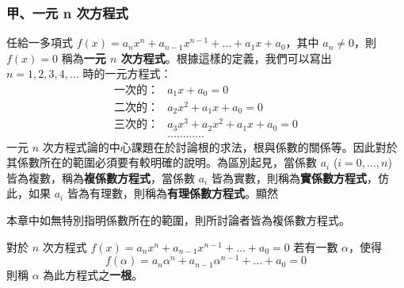 \subsubsection*{甲、一元 n 次方程式}\label{subsec:b6s-2-1-a}

任給一多項式 $f(x) = a_n x^n + a_{n-1} x^{n-1} + \dots + a_1 x + a_0$，其中 $a_n \ne 0$，則 $f(x)=0$ 稱為\textbf{一元 $n$ 次方程式}。根據這樣的定義，我們可以寫出 $n=1, 2, 3, 4, \dots$ 時的一元方程式：
\begin{align*}
\text{一次的：}& a_1 x + a_0 = 0 \\
\text{二次的：}& a_2 x^2 + a_1 x + a_0 = 0 \\
\text{三次的：}& a_3 x^3 + a_2 x^2 + a_1 x + a_0 = 0 \\
&\dots\dots\dots\dots
\end{align*}
一元 $n$ 次方程式論的中心課題在於討論根的求法，根與係數的關係等。因此對於其係數所在的範圍必須要有較明確的說明。為區別起見，當係數 $a_i$ ($i=0, \dots, n$) 皆為複數，稱為\textbf{複係數方程式}，當係數 $a_i$ 皆為實數，則稱為\textbf{實係數方程式}，仿此，如果 $a_i$ 皆為有理數，則稱為\textbf{有理係數方程式}。顯然

\begin{center}
\end{center}

本章中如無特別指明係數所在的範圍，則所討論者皆為複係數方程式。

\begin{definition}\label{def:b6s-2-1}
對於 $n$ 次方程式 $f(x) = a_n x^n + a_{n-1} x^{n-1} + \dots + a_0 = 0$ 若有一數 $\alpha$，使得
\[ f(\alpha) = a_n \alpha^n + a_{n-1} \alpha^{n-1} + \dots + a_0 = 0 \]
則稱 $\alpha$ 為此方程式之\textbf{一根}。
\end{definition}

